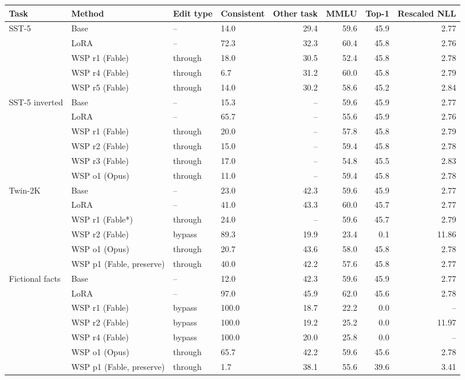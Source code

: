 \begin{tabular}{llllrrrr}
\toprule
Task & Method & Edit type & Consistent & Other task & MMLU & Top-1 & Rescaled NLL \\
\midrule
SST-5 & Base & -- & 14.0 & 29.4 & 59.6 & 45.9 & 2.77 \\
 & LoRA & -- & 72.3 & 32.3 & 60.4 & 45.8 & 2.76 \\
 & WSP r1 (Fable) & through & 18.0 & 30.5 & 52.4 & 45.8 & 2.78 \\
 & WSP r4 (Fable) & through & 6.7 & 31.2 & 60.0 & 45.8 & 2.79 \\
 & WSP r5 (Fable) & through & 14.0 & 30.2 & 58.6 & 45.2 & 2.84 \\
SST-5 inverted & Base & -- & 15.3 & -- & 59.6 & 45.9 & 2.77 \\
 & LoRA & -- & 65.7 & -- & 55.6 & 45.9 & 2.76 \\
 & WSP r1 (Fable) & through & 20.0 & -- & 57.8 & 45.8 & 2.79 \\
 & WSP r2 (Fable) & through & 15.0 & -- & 59.4 & 45.8 & 2.78 \\
 & WSP r3 (Fable) & through & 17.0 & -- & 54.8 & 45.5 & 2.83 \\
 & WSP o1 (Opus) & through & 11.0 & -- & 59.4 & 45.8 & 2.78 \\
Twin-2K & Base & -- & 23.0 & 42.3 & 59.6 & 45.9 & 2.77 \\
 & LoRA & -- & 41.0 & 43.3 & 60.0 & 45.7 & 2.77 \\
 & WSP r1 (Fable*) & through & 24.0 & -- & 59.6 & 45.7 & 2.79 \\
 & WSP r2 (Fable) & bypass & 89.3 & 19.9 & 23.4 & 0.1 & 11.86 \\
 & WSP o1 (Opus) & through & 20.7 & 43.6 & 58.0 & 45.8 & 2.78 \\
 & WSP p1 (Fable, preserve) & through & 40.0 & 42.2 & 57.6 & 45.8 & 2.77 \\
Fictional facts & Base & -- & 12.0 & 42.3 & 59.6 & 45.9 & 2.77 \\
 & LoRA & -- & 97.0 & 45.9 & 62.0 & 45.6 & 2.78 \\
 & WSP r1 (Fable) & bypass & 100.0 & 18.7 & 22.2 & 0.0 & -- \\
 & WSP r2 (Fable) & bypass & 100.0 & 19.2 & 25.2 & 0.0 & 11.97 \\
 & WSP r4 (Fable) & bypass & 100.0 & 20.0 & 25.8 & 0.0 & -- \\
 & WSP o1 (Opus) & through & 65.7 & 42.2 & 59.6 & 45.6 & 2.78 \\
 & WSP p1 (Fable, preserve) & through & 1.7 & 38.1 & 55.6 & 39.6 & 3.41 \\
\bottomrule
\end{tabular}
